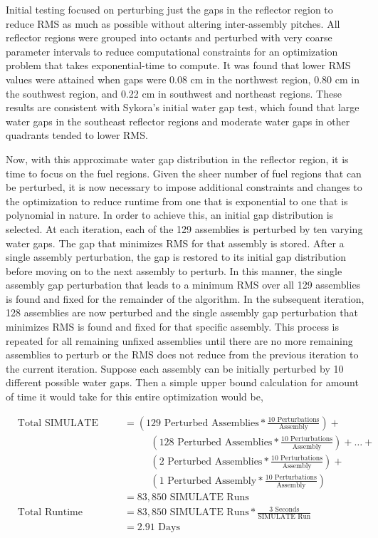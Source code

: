 \documentclass{article}
\begin{document}
Initial testing focused on perturbing just the gaps in the reflector region to reduce RMS as much as possible without altering inter-assembly pitches. All reflector regions were grouped into octants and perturbed with very coarse parameter intervals to reduce computational constraints for an optimization problem that takes exponential-time to compute. It was found that lower RMS values were attained when gaps were 0.08 cm in the northwest region, 0.80 cm in the southwest region, and 0.22 cm in southwest and northeast regions. These results are consistent with Sykora's initial water gap test, which found that large water gaps in the southeast reflector regions and moderate water gaps in other quadrants tended to lower RMS.

Now, with this approximate water gap distribution in the reflector region, it is time to focus on the fuel regions. Given the sheer number of fuel regions that can be perturbed, it is now necessary to impose additional constraints and changes to the optimization to reduce runtime from one that is exponential to one that is polynomial in nature. In order to achieve this, an initial gap distribution is selected. At each iteration, each of the 129 assemblies is perturbed by ten varying water gaps. The gap that minimizes RMS for that assembly is stored. After a single assembly perturbation, the gap is restored to its initial gap distribution before moving on to the next assembly to perturb. In this manner, the single assembly gap perturbation that leads to a minimum RMS over all 129 assemblies is found and fixed for the remainder of the algorithm. In the subsequent iteration, 128 assemblies are now perturbed and the single assembly gap perturbation that minimizes RMS is found and fixed for that specific assembly. This process is repeated for all remaining unfixed assemblies until there are no more remaining assemblies to perturb or the RMS does not reduce from the previous iteration to the current iteration. Suppose each assembly can be initially perturbed by 10 different possible water gaps. Then a simple upper bound calculation for amount of time it would take for this entire optimization would be,

\begin{align}
  &\text{Total SIMULATE Runs} &&=\left(129\text{ Perturbed Assemblies}*\frac{10\text{ Perturbations}}{\text{Assembly}}\right)+ \nonumber\\
  &  &&\phantom{==}\left(128\text{ Perturbed Assemblies}*\frac{10\text{ Perturbations}}{\text{Assembly}}\right)+\ldots+ \nonumber\\
  &  &&\phantom{==}\left(2\text{ Perturbed Assemblies}*\frac{10\text{ Perturbations}}{\text{Assembly}}\right)+\nonumber\\
  &  &&\phantom{==}\left(1\text{ Perturbed Assembly}*\frac{10\text{ Perturbations}}{\text{Assembly}}\right)\nonumber\\
  &  &&=83,850\text{ SIMULATE Runs} \nonumber\\
  &\text{Total Runtime} &&= 83,850\text{ SIMULATE Runs}*\frac{3 \text{ Seconds}}{\text{SIMULATE Run}}\nonumber\\
  &  &&= 2.91\text{ Days}
\end{align}
\end{document}
